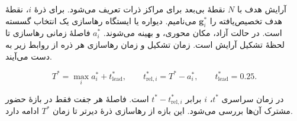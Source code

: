آرایش هدف با $N$ نقطهٔ بی‌بعد برای مراکز ذرات تعریف می‌شود.
برای ذرهٔ $i$، نقطهٔ هدف تخصیص‌یافته را $\mathbf g_i^*$ می‌نامیم.
دیواره یا ایستگاه رهاسازی یک انتخاب گسسته است.
در حالت آزاد، مکان محوری،  و  بهینه می‌شوند.
 $a_i^*$ فاصلهٔ زمانی رهاسازی تا لحظهٔ تشکیل آرایش است.
زمان تشکیل و زمان رهاسازی هر ذره از روابط زیر به دست می‌آیند.

\begin{equation}
T^*=\max_i a_i^*+t_{\mathrm{lead}}^*,
\qquad
t_{\mathrm{rel},i}^*=T^*-a_i^*,
\qquad
t_{\mathrm{lead}}^*=0.25.
\label{eq:formation-common-clock}
\end{equation}

در زمان سراسری $t^*$،  $i$ برابر $t^*-t_{\mathrm{rel},i}^*$ است.
فاصلهٔ هر جفت فقط در بازهٔ حضور مشترک آن‌ها بررسی می‌شود.
این بازه از رهاسازی ذرهٔ دیرتر تا زمان $T^*$ ادامه دارد.

